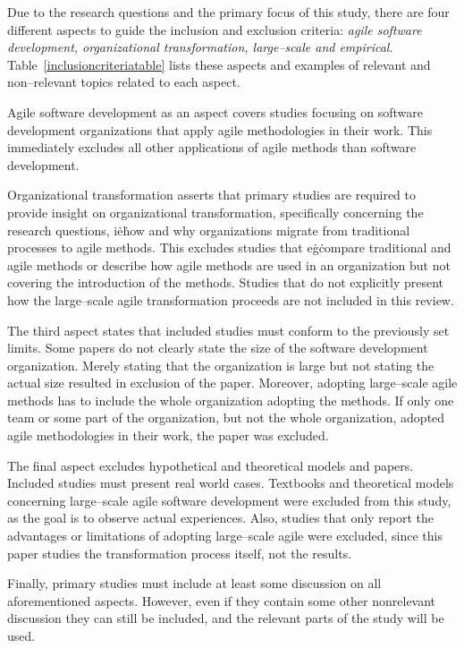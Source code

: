 Due to the research questions and the primary focus of this study, there are
four different aspects to guide the inclusion and exclusion criteria:
\textit{agile software development, organizational transformation, large–scale
and empirical}. Table~\ref{inclusioncriteriatable} lists these aspects and examples of relevant and
non–relevant topics related to each aspect.

\pagebreak

\vspace{1.5cm}

Agile software development as an aspect covers studies focusing on
software development organizations that apply agile methodologies in
their work. This immediately excludes all other applications of agile
methods than software development.

Organizational transformation asserts that primary studies are required
to provide insight on organizational transformation, specifically
concerning the research questions, i\.e\. how and why organizations
migrate from traditional processes to agile methods. This excludes
studies that e\.g\. compare traditional and agile methods or describe
how agile methods are used in an organization but not covering the
introduction of the methods. Studies that do not explicitly present how
the large–scale agile transformation proceeds are not included in this
review.

The third aspect states that included studies must conform to the
previously set limits. Some papers do not clearly state the size of the
software development organization. Merely stating that the organization
is large but not stating the actual size resulted in exclusion of the
paper. Moreover, adopting large–scale agile methods has to include the
whole organization adopting the methods. If only one team or some part
of the organization, but not the whole organization, adopted agile
methodologies in their work, the paper was excluded.

The final aspect excludes hypothetical and theoretical models and
papers. Included studies must present real world cases. Textbooks
and theoretical models concerning large–scale agile software
development were excluded from this study, as the goal is to observe
actual experiences. Also, studies that only report the advantages or
limitations of adopting large–scale agile were excluded, since this
paper studies the transformation process itself, not the results.

Finally, primary studies must include at least some discussion on
all aforementioned aspects. However, even if they contain some other
nonrelevant discussion they can still be included, and the relevant
parts of the study will be used.

